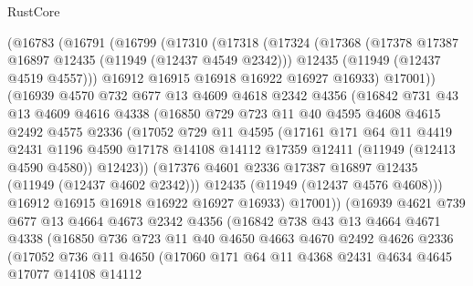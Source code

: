\begin{lexlean}{RustCore}
\begin{coremodule}
    (@16783
      (@16791
        (@16799
          (@17310
            (@17318
              (@17324
                (@17368
                  (@17378 @17387 @16897 @12435 (@11949 (@12437 @4549 @2342)))
                  @12435
                  (@11949 (@12437 @4519 @4557)))
                @16912
                @16915
                @16918
                @16922
                @16927
                @16933)
              @17001))
          (@16939
            @4570
            @732
            @677
            @13
            @4609
            @4618
            @2342
            @4356
            (@16842
              @731
              @43
              @13
              @4609
              @4616
              @4338
              (@16850
                @729
                @723
                @11
                @40
                @4595
                @4608
                @4615
                @2492
                @4575
                @2336
                (@17052
                  @729
                  @11
                  @4595
                  (@17161
                    @171
                    @64
                    @11
                    @4419
                    @2431
                    @1196
                    @4590
                    @17178
                    @14108
                    @14112
                    @17359
                    @12411
                    (@11949 (@12413 @4590 @4580))
                    @12423))
                (@17376 @4601 @2336 @17387 @16897 @12435 (@11949 (@12437 @4602 @2342)))
                @12435
                (@11949 (@12437 @4576 @4608)))
              @16912
              @16915
              @16918
              @16922
              @16927
              @16933)
            @17001))
        (@16939
          @4621
          @739
          @677
          @13
          @4664
          @4673
          @2342
          @4356
          (@16842
            @738
            @43
            @13
            @4664
            @4671
            @4338
            (@16850
              @736
              @723
              @11
              @40
              @4650
              @4663
              @4670
              @2492
              @4626
              @2336
              (@17052
                @736
                @11
                @4650
                (@17060
                  @171
                  @64
                  @11
                  @4368
                  @2431
                  @4634
                  @4645
                  @17077
                  @14108
                  @14112

\end{coremodule}
\end{lexlean}

